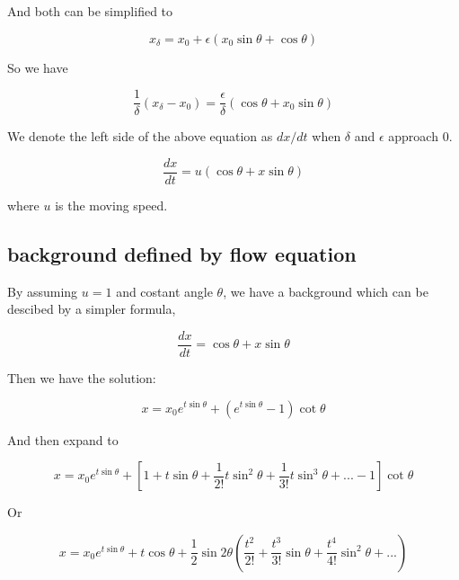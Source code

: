 \documentclass{article}
\begin{document}
And both can be simplified to

\begin{equation}
    x_{\delta} = x_0 + \epsilon (x_0 \sin \theta + \cos \theta)
\end{equation}

So we have

\begin{equation}
    \frac{1}{\delta} (x_{\delta} - x_0) = \frac{\epsilon}{\delta} (\cos \theta + x_0 \sin \theta)
\end{equation}

We denote the left side of the above equation as $dx / dt$ when $\delta$ and $\epsilon$ approach 0.

\begin{equation}
    \frac{dx}{dt} = u (\cos \theta + x \sin \theta)
    \label{eqn:flow}
\end{equation}

where $u$ is the moving speed.

\subsection{background defined by flow equation}\label{sec:}

By assuming $u = 1$ and costant angle $\theta$, we have a background which can be descibed by a simpler formula,

\begin{equation}
    \frac{dx}{dt} = \cos \theta + x \sin \theta
\end{equation}

Then we have the solution:

\begin{equation}
   x = x_0 e^{t \sin \theta} + (e^{t \sin \theta} - 1) \cot \theta
\end{equation}

And then expand to

\begin{equation}
   x =  x_0 e^{t \sin \theta} + [1 + t \sin \theta + \frac{1}{2!} t\sin^2 \theta  + \frac{1}{3!} t \sin^3 \theta + ... - 1] \cot \theta
\end{equation}

Or

\begin{equation}
   x =  x_0 e^{t \sin \theta} + t \cos \theta + \frac{1}{2} \sin 2\theta (\frac{t^2}{2!} + \frac{t^3}{3!} \sin \theta + \frac{t^4}{4!} \sin^2 \theta + ...)
\end{equation}
\end{document}
